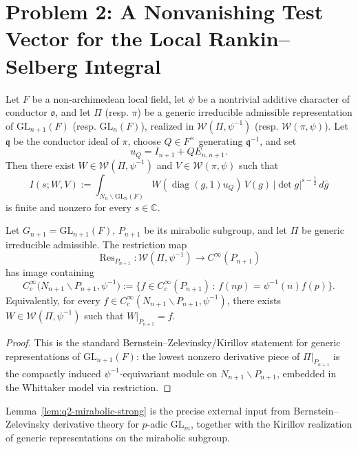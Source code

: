 \section{Problem 2: A Nonvanishing Test Vector for the Local Rankin--Selberg Integral}\label{sec:q2}

\begin{proposition}
Let $F$ be a non-archimedean local field, let $\psi$ be a nontrivial additive character of conductor $\mathfrak o$, and let $\Pi$ (resp. $\pi$) be a generic irreducible admissible representation of $\mathrm{GL}_{n+1}(F)$ (resp. $\mathrm{GL}_n(F)$), realized in $\mathcal W(\Pi,\psi^{-1})$ (resp. $\mathcal W(\pi,\psi)$). Let $\mathfrak q$ be the conductor ideal of $\pi$, choose $Q\in F^\times$ generating $\mathfrak q^{-1}$, and set
\[
u_Q=I_{n+1}+Q E_{n,n+1}.
\]
Then there exist $W\in\mathcal W(\Pi,\psi^{-1})$ and $V\in\mathcal W(\pi,\psi)$ such that
\[
I(s;W,V):=\int_{N_n\backslash \mathrm{GL}_n(F)}
W(\operatorname{diag}(g,1)u_Q)\,V(g)\,|\det g|^{s-\frac12}\,d\bar g
\]
is finite and nonzero for every $s\in\mathbb C$.
\end{proposition}

\begin{lemma}\label{lem:q2-mirabolic-strong}
Let $G_{n+1}=\mathrm{GL}_{n+1}(F)$, $P_{n+1}$ be its mirabolic subgroup, and let $\Pi$ be generic irreducible admissible. The restriction map
\[
\operatorname{Res}_{P_{n+1}}:\mathcal W(\Pi,\psi^{-1})\to C^\infty(P_{n+1})
\]
has image containing
\[
C_c^\infty\bigl(N_{n+1}\backslash P_{n+1},\psi^{-1}\bigr)
:=\{f\in C_c^\infty(P_{n+1})\,:\,f(np)=\psi^{-1}(n)f(p)\}.
\]
Equivalently, for every $f\in C_c^\infty(N_{n+1}\backslash P_{n+1},\psi^{-1})$, there exists $W\in\mathcal W(\Pi,\psi^{-1})$ such that $W|_{P_{n+1}}=f$.
\end{lemma}

\begin{proof}
This is the standard Bernstein--Zelevinsky/Kirillov statement for generic representations of $\mathrm{GL}_{n+1}(F)$: the lowest nonzero derivative piece of $\Pi|_{P_{n+1}}$ is the compactly induced $\psi^{-1}$-equivariant module on $N_{n+1}\backslash P_{n+1}$, embedded in the Whittaker model via restriction.
\end{proof}

\begin{remark}
Lemma~\ref{lem:q2-mirabolic-strong} is the precise external input from Bernstein--Zelevinsky derivative theory for $p$-adic $\mathrm{GL}_m$, together with the Kirillov realization of generic representations on the mirabolic subgroup.
\end{remark}

